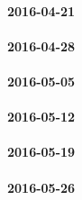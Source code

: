 \paragraph{2016-04-21}

\paragraph{2016-04-28}

\paragraph{2016-05-05}

\paragraph{2016-05-12}

\paragraph{2016-05-19}

\paragraph{2016-05-26}

